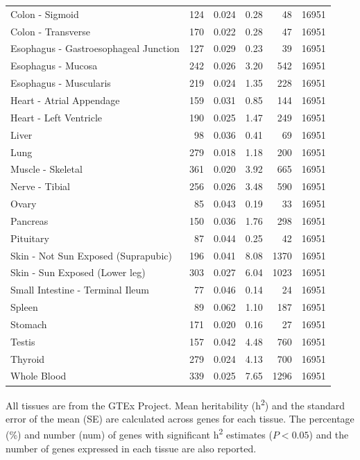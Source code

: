 \documentclass[10pt,letterpaper]{article}
\begin{document}
\begin{table}[!ht]
\begin{adjustwidth}{-2.25in}{0in}
\begin{tabular}{lrrrrr}
  Colon - Sigmoid & 124 & 0.024 & 0.28 & 48 & 16951 \\ 
  Colon - Transverse & 170 & 0.022 & 0.28 & 47 & 16951 \\ 
  Esophagus - Gastroesophageal Junction & 127 & 0.029 & 0.23 & 39 & 16951 \\ 
  Esophagus - Mucosa & 242 & 0.026 & 3.20 & 542 & 16951 \\ 
  Esophagus - Muscularis & 219 & 0.024 & 1.35 & 228 & 16951 \\ 
  Heart - Atrial Appendage & 159 & 0.031 & 0.85 & 144 & 16951 \\ 
  Heart - Left Ventricle & 190 & 0.025 & 1.47 & 249 & 16951 \\ 
  Liver & 98 & 0.036 & 0.41 & 69 & 16951 \\ 
  Lung & 279 & 0.018 & 1.18 & 200 & 16951 \\ 
  Muscle - Skeletal & 361 & 0.020 & 3.92 & 665 & 16951 \\ 
  Nerve - Tibial & 256 & 0.026 & 3.48 & 590 & 16951 \\ 
  Ovary & 85 & 0.043 & 0.19 & 33 & 16951 \\ 
  Pancreas & 150 & 0.036 & 1.76 & 298 & 16951 \\ 
  Pituitary & 87 & 0.044 & 0.25 & 42 & 16951 \\ 
  Skin - Not Sun Exposed (Suprapubic) & 196 & 0.041 & 8.08 & 1370 & 16951 \\ 
  Skin - Sun Exposed (Lower leg) & 303 & 0.027 & 6.04 & 1023 & 16951 \\ 
  Small Intestine - Terminal Ileum & 77 & 0.046 & 0.14 & 24 & 16951 \\ 
  Spleen & 89 & 0.062 & 1.10 & 187 & 16951 \\ 
  Stomach & 171 & 0.020 & 0.16 & 27 & 16951 \\ 
  Testis & 157 & 0.042 & 4.48 & 760 & 16951 \\ 
  Thyroid & 279 & 0.024 & 4.13 & 700 & 16951 \\ 
  Whole Blood & 339 & 0.025 & 7.65 & 1296 & 16951 \\ 
   \hline
\end{tabular}
\begin{flushleft} All tissues are from the GTEx Project. Mean heritability (h\textsuperscript{2}) and the standard error of the mean (SE) are calculated across genes for each tissue. The percentage (\%) and number (num) of genes with significant h\textsuperscript{2} estimates ($P<0.05$) and the number of genes expressed in each tissue are also reported. 
\end{flushleft}
\end{adjustwidth}
\end{table}
\end{document}
